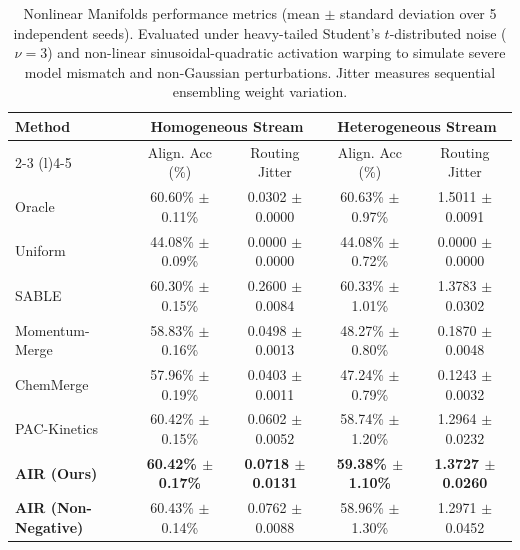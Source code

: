 \documentclass{article}
\theoremstyle{plain}
\theoremstyle{definition}
\theoremstyle{remark}
\begin{document}
\begin{table}[H]
\caption{Nonlinear Manifolds performance metrics (mean $\pm$ standard deviation over 5 independent seeds). Evaluated under heavy-tailed Student's $t$-distributed noise ($\nu=3$) and non-linear sinusoidal-quadratic activation warping to simulate severe model mismatch and non-Gaussian perturbations. Jitter measures sequential ensembling weight variation.}
\label{tab:nonlinear_results}
\vskip 0.1in
\begin{center}
\begin{small}
\begin{sc}
\setlength{\tabcolsep}{2pt}
\begin{tabular}{lcccc}
\toprule
Method & \multicolumn{2}{c}{Homogeneous Stream} & \multicolumn{2}{c}{Heterogeneous Stream} \\
\cmidrule(r){2-3} \cmidrule(l){4-5}
& Align. Acc (\%) & Routing Jitter & Align. Acc (\%) & Routing Jitter \\
\midrule
Oracle & 60.60\% $\pm$ 0.11\% & 0.0302 $\pm$ 0.0000 & 60.63\% $\pm$ 0.97\% & 1.5011 $\pm$ 0.0091 \\
Uniform & 44.08\% $\pm$ 0.09\% & 0.0000 $\pm$ 0.0000 & 44.08\% $\pm$ 0.72\% & 0.0000 $\pm$ 0.0000 \\
SABLE \cite{sable2024} & 60.30\% $\pm$ 0.15\% & 0.2600 $\pm$ 0.0084 & 60.33\% $\pm$ 1.01\% & 1.3783 $\pm$ 0.0302 \\
Momentum-Merge \cite{momentummerge2025} & 58.83\% $\pm$ 0.16\% & 0.0498 $\pm$ 0.0013 & 48.27\% $\pm$ 0.80\% & 0.1870 $\pm$ 0.0048 \\
ChemMerge \cite{chemmerge2025} & 57.96\% $\pm$ 0.19\% & 0.0403 $\pm$ 0.0011 & 47.24\% $\pm$ 0.79\% & 0.1243 $\pm$ 0.0032 \\
PAC-Kinetics \cite{packinetics2025} & 60.42\% $\pm$ 0.15\% & 0.0602 $\pm$ 0.0052 & 58.74\% $\pm$ 1.20\% & 1.2964 $\pm$ 0.0232 \\
\midrule
\textbf{AIR (Ours)} & \textbf{60.42\% $\pm$ 0.17\%} & \textbf{0.0718 $\pm$ 0.0131} & \textbf{59.38\% $\pm$ 1.10\%} & \textbf{1.3727 $\pm$ 0.0260} \\
\textbf{AIR (Non-Negative)} & 60.43\% $\pm$ 0.14\% & 0.0762 $\pm$ 0.0088 & 58.96\% $\pm$ 1.30\% & 1.2971 $\pm$ 0.0452 \\
\bottomrule
\end{tabular}
\end{sc}
\end{small}
\end{center}
\vskip -0.1in
\end{table}
\end{document}
